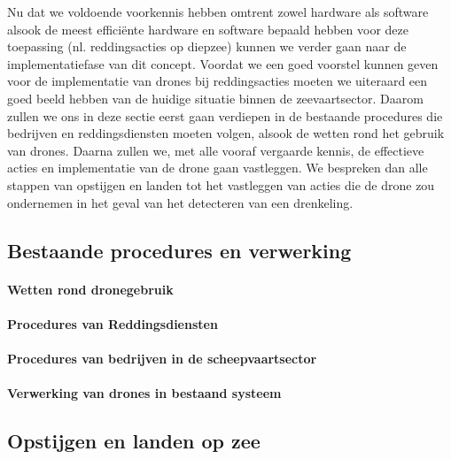 \subitem
Nu dat we voldoende voorkennis hebben omtrent zowel hardware als software alsook de meest efficiënte hardware en software bepaald hebben voor deze toepassing (nl. reddingsacties op diepzee) kunnen we verder gaan naar de implementatiefase van dit concept. Voordat we een goed voorstel kunnen geven voor de implementatie van drones bij reddingsacties moeten we uiteraard een goed beeld hebben van de huidige situatie binnen de zeevaartsector. Daarom zullen we ons in deze sectie eerst gaan verdiepen in de bestaande procedures die bedrijven en reddingsdiensten moeten volgen, alsook de wetten rond het gebruik van drones. Daarna zullen we, met alle vooraf vergaarde kennis, de effectieve acties en implementatie van de drone gaan vastleggen. We bespreken dan alle stappen van opstijgen en landen tot het vastleggen van acties die de drone zou ondernemen in het geval van het detecteren van een drenkeling. 

\subsection{Bestaande procedures en verwerking}

\paragraph{Wetten rond dronegebruik}

\lipsum[1-2]

\paragraph{Procedures van Reddingsdiensten}

\lipsum[1-2]

\paragraph{Procedures van bedrijven in de scheepvaartsector}

\lipsum[1-2]

\paragraph{Verwerking van drones in bestaand systeem}

\lipsum[1-2]

\subsection{Opstijgen en landen op zee}

